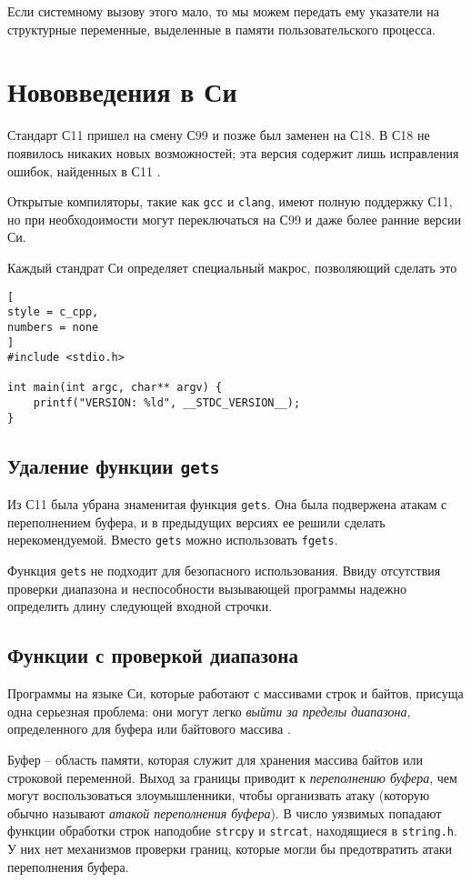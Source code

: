 \documentclass[%
	11pt,
	a4paper,
	utf8,
		]{article}
\begin{document}
Если системному вызову этого мало, то мы можем передать ему указатели на структурные переменные, выделенные в памяти пользовательского процесса.

\section{Нововведения в Си}

Стандарт С11 пришел на смену С99 и позже был заменен на С18. В С18 не появилось никаких новых возможностей; эта версия содержит лишь исправления ошибок, найденных в С11 \cite[]{amini-extreme-c:2022}.

Открытые компиляторы, такие как \verb|gcc| и \verb|clang|, имеют полную поддержку С11, но при необходоимости могут переключаться на С99 и даже более ранние версии Си.

Каждый стандрат Си определяет специальный макрос, позволяющий сделать это
\begin{lstlisting}[
style = c_cpp,
numbers = none
]
#include <stdio.h>

int main(int argc, char** argv) {
    printf("VERSION: %ld", __STDC_VERSION__);
}
\end{lstlisting}

\subsection{Удаление функции \texttt{gets}}

Из С11 была убрана знаменитая функция \verb|gets|. Она была подвержена атакам с переполнением буфера, и в предыдущих версиях ее решили сделать нерекомендуемой. Вместо \verb|gets| можно использовать \verb|fgets|.

Функция \verb|gets| не подходит для безопасного использования. Ввиду отсутствия проверки диапазона и неспособности вызывающей программы надежно определить длину следующей входной строчки.

\subsection{Функции с проверкой диапазона}

Программы на языке Си, которые работают с массивами строк и байтов, присуща одна серьезная проблема: они могут легко \emph{выйти за пределы диапазона}, определенного для буфера или байтового массива \cite[]{amini-extreme-c:2022}. 

Буфер -- область памяти, которая служит для хранения массива байтов или строковой переменной. Выход за границы приводит к \emph{переполнению буфера}, чем могут воспользоваться злоумышленники, чтобы организвать атаку (которую обычно называют \emph{атакой переполнения буфера}). В число уязвимых попадают функции обработки строк наподобие \verb|strcpy| и \verb|strcat|, находящиеся в \verb|string.h|. У них нет механизмов проверки границ, которые могли бы предотвратить атаки переполнения буфера.
\end{document}
